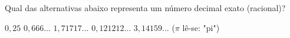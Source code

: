Qual das alternativas abaixo representa um número decimal exato (racional)?

$0{,}25$
$0{,}666...$
$1{,}71717...$
$0{,}121212...$
$3{,}14159...$ ($\pi$ lê-se: "pi")



